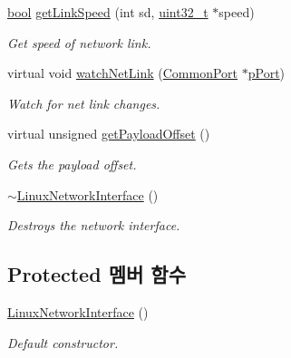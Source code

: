 \begin{DoxyCompactItemize}
\hyperlink{avb__gptp_8h_af6a258d8f3ee5206d682d799316314b1}{bool} \hyperlink{class_linux_network_interface_a5c60a048f947174b7a53a9a7253800b5}{get\+Link\+Speed} (int sd, \hyperlink{parse_8c_a6eb1e68cc391dd753bc8ce896dbb8315}{uint32\+\_\+t} $\ast$speed)
\begin{DoxyCompactList}\small\item\em Get speed of network link. \end{DoxyCompactList}\item 
virtual void \hyperlink{class_linux_network_interface_a2d20b70884c94962cd11bd51d92617b4}{watch\+Net\+Link} (\hyperlink{class_common_port}{Common\+Port} $\ast$\hyperlink{linux_2src_2daemon__cl_8cpp_aca059781ed4d0e5fca3b46246d5c5ad3}{p\+Port})
\begin{DoxyCompactList}\small\item\em Watch for net link changes. \end{DoxyCompactList}\item 
virtual unsigned \hyperlink{class_linux_network_interface_a469ba253e35431e728100188397d9d02}{get\+Payload\+Offset} ()
\begin{DoxyCompactList}\small\item\em Gets the payload offset. \end{DoxyCompactList}\item 
\hyperlink{class_linux_network_interface_ab2f5b4dbafcf607004b3ab710d32ac61}{$\sim$\+Linux\+Network\+Interface} ()
\begin{DoxyCompactList}\small\item\em Destroys the network interface. \end{DoxyCompactList}\end{DoxyCompactItemize}
\subsection*{Protected 멤버 함수}
\begin{DoxyCompactItemize}
\item 
\hyperlink{class_linux_network_interface_ae481d5766c300e764878a69011dea800}{Linux\+Network\+Interface} ()
\begin{DoxyCompactList}\small\item\em Default constructor. \end{DoxyCompactList}\end{DoxyCompactItemize}
